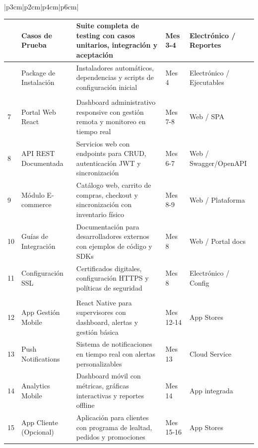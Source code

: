 \documentclass[12pt,letterpaper]{article}
\begin{document}
\begin{longtable}{|p{3cm}|p{2cm}|p{4cm}|p{6cm}|}
\begin{longtable}{|>{\centering}p{1cm}|p{4cm}|p{6cm}|>{\centering}p{2.5cm}|>{\centering\arraybackslash}p{2.5cm}|}
5 & Casos de Prueba & Suite completa de testing con casos unitarios, integración y aceptación & Mes 3-4 & Electrónico / Reportes \\
\hline

6 & Package de Instalación & Instaladores automáticos, dependencias y scripts de configuración inicial & Mes 4 & Electrónico / Ejecutables \\
\hline

\multicolumn{5}{|c|}{\cellcolor{cobraorange!20}\textbf{FASE 2: EXPANSIÓN WEB}} \\
\hline

7 & Portal Web React & Dashboard administrativo responsive con gestión remota y monitoreo en tiempo real & Mes 7-8 & Web / SPA \\
\hline

8 & API REST Documentada & Servicios web con endpoints para CRUD, autenticación JWT y sincronización & Mes 6-7 & Web / Swagger/OpenAPI \\
\hline

9 & Módulo E-commerce & Catálogo web, carrito de compras, checkout y sincronización con inventario físico & Mes 8-9 & Web / Plataforma \\
\hline

10 & Guías de Integración & Documentación para desarrolladores externos con ejemplos de código y SDKs & Mes 8 & Web / Portal docs \\
\hline

11 & Configuración SSL & Certificados digitales, configuración HTTPS y políticas de seguridad & Mes 8 & Electrónico / Config \\
\hline

\multicolumn{5}{|c|}{\cellcolor{cobraorange!20}\textbf{FASE 3: APLICACIONES MÓVILES}} \\
\hline

12 & App Gestión Mobile & React Native para supervisores con dashboard, alertas y gestión básica & Mes 12-14 & App Stores \\
\hline

13 & Push Notifications & Sistema de notificaciones en tiempo real con alertas personalizables & Mes 13 & Cloud Service \\
\hline

14 & Analytics Mobile & Dashboard móvil con métricas, gráficas interactivas y reportes offline & Mes 14 & App integrada \\
\hline

15 & App Cliente (Opcional) & Aplicación para clientes con programa de lealtad, pedidos y promociones & Mes 15-16 & App Stores \\
\hline


\end{longtable}
\end{longtable}
\end{document}
